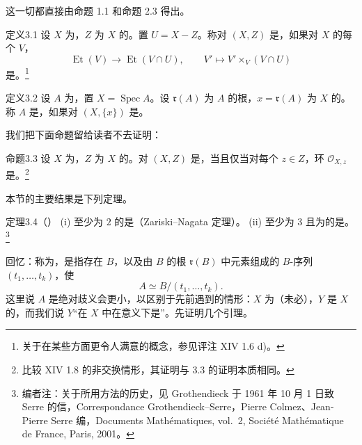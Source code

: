这一切都直接由命题 1.1 和命题 2.3 得出。
\begin{SGAresult}{定义}{3.1}
设 $X$ 为，$Z$ 为 $X$ 的。置 $U=X-Z$。称对 $(X,Z)$ 是，如果对 $X$ 的每个 $V$，
\[\operatorname{Et}(V)\longrightarrow\operatorname{Et}(V\cap U),\qquad V'\longmapsto V'\times_V(V\cap U)\]
是。\footnote{关于在某些方面更令人满意的概念，参见评注 XIV 1.6 d)。}
\end{SGAresult}
\begin{SGAresult}{定义}{3.2}
设 $A$ 为，置 $X=\operatorname{Spec}A$。设 $\mathfrak r(A)$ 为 $A$ 的根，$x=\mathfrak r(A)$ 为 $X$ 的。称 $A$ 是，如果对 $(X,\{x\})$ 是。
\end{SGAresult}
我们把下面命题留给读者不去证明：
\begin{SGAresult}{命题}{3.3}
设 $X$ 为，$Z$ 为 $X$ 的。对 $(X,Z)$ 是，当且仅当对每个 $z\in Z$，环 $\mathcal O_{X,z}$ 是。\footnote{比较 XIV 1.8 的非交换情形，其证明与 3.3 的证明本质相同。}
\end{SGAresult}
本节的主要结果是下列定理。
\begin{SGAresult}{定理}{3.4（）}
(i) 至少为 $2$ 的是（Zariski--Nagata 定理）。
(ii) 至少为 $3$ 且为的是。\footnote{编者注：关于所用方法的历史，见 Grothendieck 于 1961 年 10 月 1 日致 Serre 的信，Correspondance Grothendieck--Serre，Pierre Colmez、Jean-Pierre Serre 编，Documents Mathématiques, vol.~2, Société Mathématique de France, Paris, 2001。}
\end{SGAresult}
回忆：称为，是指存在 $B$，以及由 $B$ 的根 $\mathfrak r(B)$ 中元素组成的 $B$-序列 $(t_1,\ldots,t_k)$，使
\[A\simeq B/(t_1,\ldots,t_k).\]
这里说 $A$ 是绝对歧义会更小，以区别于先前遇到的情形：$X$ 为（未必），$Y$ 是 $X$ 的，而我们说 $Y$“在 $X$ 中在意义下是”。先证明几个引理。
